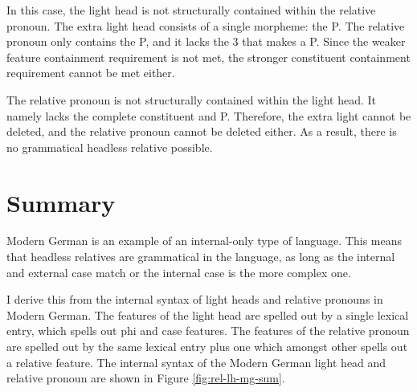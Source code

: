 In this case, the light head is not structurally contained within the relative pronoun.
The extra light head consists of a single morpheme: the P.
The relative pronoun only contains the P, and it lacks the 3 that makes a P. Since the weaker feature containment requirement is not met, the stronger constituent containment requirement cannot be met either.

The relative pronoun is not structurally contained within the light head. It namely lacks the complete constituent and P.
Therefore, the extra light cannot be deleted, and the relative pronoun cannot be deleted either.
As a result, there is no grammatical headless relative possible.

\section{Summary}

Modern German is an example of an internal-only type of language. This means that headless relatives are grammatical in the language, as long as the internal and external case match or the internal case is the more complex one.

I derive this from the internal syntax of light heads and relative pronouns in Modern German. The features of the light head are spelled out by a single lexical entry, which spells out phi and case features. The features of the relative pronoun are spelled out by the same lexical entry plus one which amongst other spells out a relative feature. The internal syntax of the Modern German light head and relative pronoun are shown in Figure \ref{fig:rel-lh-mg-sum}.

